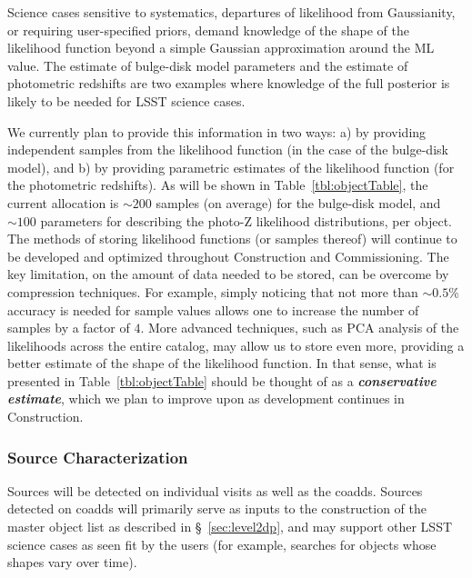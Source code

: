 \documentclass[12pt]{article}
\begin{document}
Science cases sensitive to systematics, departures of likelihood from Gaussianity, or requiring user-specified priors, demand knowledge of the shape of the likelihood function beyond a simple Gaussian approximation around the ML value. The estimate of bulge-disk model parameters and the estimate of photometric redshifts are two examples where knowledge of the full posterior is likely to be needed for LSST science cases.

We currently plan to provide this information in two ways: a) by providing independent samples from the likelihood function (in the case of the bulge-disk model), and b) by providing parametric estimates of the likelihood function (for the photometric redshifts). As will be shown in Table~\ref{tbl:objectTable}, the current allocation is $\sim 200$ samples (on average) for the bulge-disk model, and $\sim 100$ parameters for describing the photo-Z likelihood distributions, per object.
\\

The methods of storing likelihood functions (or samples thereof) will continue to be developed and optimized throughout Construction and Commissioning. The key limitation, on the amount of data needed to be stored, can be overcome by compression techniques. For example, simply noticing that not more than $\sim 0.5$\% accuracy is needed for sample values allows one to increase the number of samples by a factor of $4$. More advanced techniques, such as PCA analysis of the likelihoods across the entire catalog, may allow us to store even more, providing a better estimate of the shape of the likelihood function. In that sense, what is presented in Table~\ref{tbl:objectTable} should be thought of as a {\bf \em conservative estimate}, which we plan to improve upon as development continues in Construction.

\subsubsection{Source Characterization}
\label{sec:sourceMeas}

Sources will be detected on individual visits as well as the coadds. Sources detected on coadds will primarily serve as inputs to the construction of the master object list as described in \S~\ref{sec:level2dp}, and may support other LSST science cases as seen fit by the users (for example, searches for objects whose shapes vary over time).
\\
\end{document}
